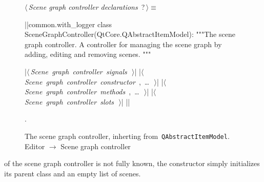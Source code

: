 \documentclass[%
    a4paper,    %
    justified,  %
    nobib,      %
    openany     %
]{tufte-book}
\begin{document}
\begin{figure}
\begin{flushleft} \small
\begin{minipage}{\linewidth}\label{scrap25}\raggedright\small
{} $\langle\,${\itshape Scene graph controller declarations}\nobreak\ {\footnotesize {?}}$\,\rangle\equiv$
\vspace{-1ex}
\begin{pythoncode}
|\normalfont{}\fontfamily{}|common.with_logger
class SceneGraphController(QtCore.QAbstractItemModel):
    """The scene graph controller.
    A controller for managing the scene graph by adding,
    editing and removing scenes.
    """

    |\hbox{$\langle\,${\itshape Scene graph controller signals}\nobreak\ {\footnotesize {}}$\,\rangle$}|
    |\hbox{$\langle\,${\itshape Scene graph controller constructor}\nobreak\ {\footnotesize {}, \ldots\ }$\,\rangle$}|
    |\hbox{$\langle\,${\itshape Scene graph controller methods}\nobreak\ {\footnotesize {}, \ldots\ }$\,\rangle$}|
    |\hbox{$\langle\,${\itshape Scene graph controller slots}\nobreak\ {\footnotesize {}}$\,\rangle$}|
|\NWsep|
\end{pythoncode}
\vspace{1.5ex}
\footnotesize
\begin{list}{}{\setlength{\itemsep}{-\parsep}\setlength{\itemindent}{-\leftmargin}}
\item {\NWtxtMacroNoRef}.

\item{}
\end{list}
\end{minipage}\vspace{4ex}
\end{flushleft}
\caption{The scene graph controller, inherting from~\texttt{QAbstractItemModel}.
  \newline{}\newline{}Editor $\rightarrow$ Scene graph controller}
\label{editor:lst:scene-graph-controller}
\end{figure}

 of the scene graph controller is
not fully known, the constructor simply initializes its parent class and an
empty list of scenes.
\end{document}
